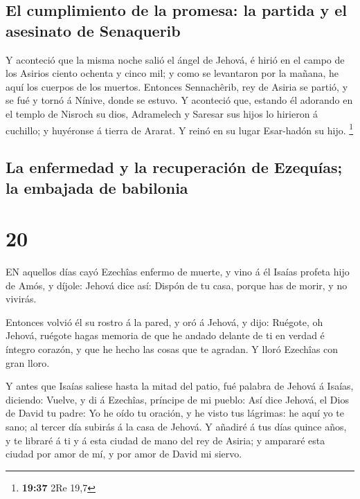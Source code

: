 \hypertarget{el-cumplimiento-de-la-promesa-la-partida-y-el-asesinato-de-senaquerib}{%
\subsection{El cumplimiento de la promesa: la partida y el asesinato de
Senaquerib}\label{el-cumplimiento-de-la-promesa-la-partida-y-el-asesinato-de-senaquerib}}

 Y aconteció que la misma noche salió el ángel de Jehová, é
hirió en el campo de los Asirios ciento ochenta y cinco mil; y como se
levantaron por la mañana, he aquí los cuerpos de los muertos.
 Entonces Sennachêrib, rey de Asiria se partió, y se fué y
tornó á Nínive, donde se estuvo.  Y aconteció que, estando
él adorando en el templo de Nisroch su dios, Adramelech y Saresar sus
hijos lo hirieron á cuchillo; y huyéronse á tierra de Ararat. Y reinó en
su lugar Esar-hadón su hijo. \footnote{\textbf{19:37} 2Re 19,7}

\hypertarget{la-enfermedad-y-la-recuperaciuxf3n-de-ezequuxedas-la-embajada-de-babilonia}{%
\subsection{La enfermedad y la recuperación de Ezequías; la embajada de
babilonia}\label{la-enfermedad-y-la-recuperaciuxf3n-de-ezequuxedas-la-embajada-de-babilonia}}

\hypertarget{section-19}{%
\section{20}\label{section-19}}

 EN aquellos días cayó Ezechîas enfermo de muerte, y vino á
él Isaías profeta hijo de Amós, y díjole: Jehová dice así: Dispón de tu
casa, porque has de morir, y no vivirás.

 Entonces volvió él su rostro á la pared, y oró á Jehová, y
dijo:  Ruégote, oh Jehová, ruégote hagas memoria de que he
andado delante de ti en verdad é íntegro corazón, y que he hecho las
cosas que te agradan. Y lloró Ezechîas con gran lloro.

 Y antes que Isaías saliese hasta la mitad del patio, fué
palabra de Jehová á Isaías, diciendo:  Vuelve, y di á
Ezechîas, príncipe de mi pueblo: Así dice Jehová, el Dios de David tu
padre: Yo he oído tu oración, y he visto tus lágrimas: he aquí yo te
sano; al tercer día subirás á la casa de Jehová.  Y añadiré
á tus días quince años, y te libraré á ti y á esta ciudad de mano del
rey de Asiria; y ampararé esta ciudad por amor de mí, y por amor de
David mi siervo.

